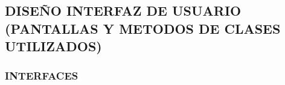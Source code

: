 \subsection{DISEÑO INTERFAZ DE USUARIO (PANTALLAS Y METODOS DE CLASES UTILIZADOS)}
\subsubsection{INTERFACES}